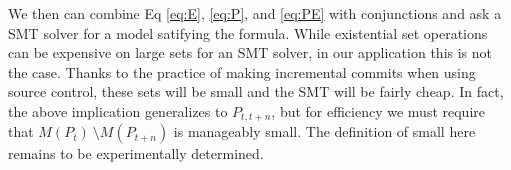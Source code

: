We then can combine Eq \ref{eq:E}, \ref{eq:P}, and \ref{eq:PE} with conjunctions and ask a SMT solver for a model satifying the formula.
While existential set operations can be expensive on large sets for an SMT solver, in our application this is not the case.
Thanks to the practice of making incremental commits when using source control, these sets will be small and the SMT will be fairly cheap.
In fact, the above implication generalizes to $P_{t,t+n}$, but for efficiency we must require that $M(P_{t})\ \setminus M(P_{t+n})$ is manageably small.
The definition of small here remains to be experimentally determined.
